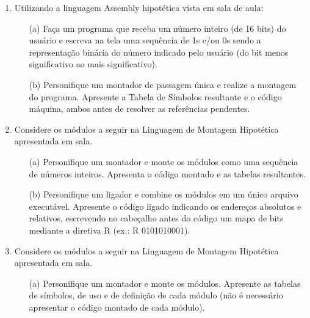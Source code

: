 \begin{enumerate}
    \item
    Utilizando a linguagem Assembly hipotética vista em sala de aula:
    \begin{itemize}
        \item [(a)]
        Faça um programa que receba um número inteiro (de 16 bits) do usuário
        e escreva na tela uma sequência de 1s e/ou 0s 
        sendo a representação binária do número indicado pelo usuário 
        (do bit menos significativo ao mais significativo).

        \item [(b)]
        Personifique um montador de passagem única e realize a montagem do programa.
        Apresente a Tabela de Símbolos resultante e o código máquina,
        ambos antes de resolver as referências pendentes.
    \end{itemize}

    \item
    Considere os módulos a seguir na Linguagem de Montagem Hipotética apresentada em sala.
    \begin{multicols}{2}
        \columnbreak
    \end{multicols}

    \begin{itemize}
        \item [(a)]
        Personifique um montador e monte os módulos como uma sequência de números inteiros. 
        Apresenta o código montado e as tabelas resultantes.

        \item [(b)]
        Personifique um ligador e combine os módulos em um único arquivo executável.
        Apresente o código ligado indicando os endereços absolutos e relativos,
        escrevendo no cabeçalho antes do código um mapa de bits mediante a diretiva R
        (ex.: R 0101010001). 
    \end{itemize}

    \item 
    Considere os módulos a seguir na Linguagem de Montagem Hipotética apresentada em sala.
    \begin{multicols}{3}
        \columnbreak
        \columnbreak
    \end{multicols}
    \begin{itemize}
        \item [(a)]
        Personifique um montador e monte os módulos. 
        Apresente as tabelas de símbolos, de uso e de definição de cada módulo
        (não é necessário apresentar o código montado de cada módulo).


\end{itemize}
\end{enumerate}
